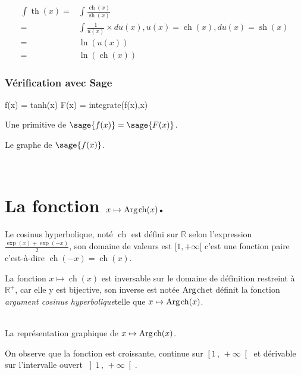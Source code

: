\documentclass[a4paper,12pt]{report}
\def\eclaire{\mathbb}
\def\R{\ensuremath{\eclaire R}}
\renewcommand{\sinh}{\mathop{\mathrm{sh}}}
\renewcommand{\cosh}{\mathop{\mathrm{ch}}}
\renewcommand{\tanh}{\mathop{\mathrm{th}}}
\renewcommand{\arg}{\mathop{\mathrm{Arg}}}
\begin{document}
\begin{align*}
\int \tanh(x) = &\int \frac{\cosh(x)}{\sinh(x)} \\  = & \int \frac{1}{u(x)} \times du(x), u(x) =  \cosh(x), du(x) = \sinh(x) \\ = & \ln(u(x)) \\ = & \ln(\cosh(x))
\end{align*}


\subsubsection{Vérification avec Sage}


\begin{sageblock}
    f(x) = tanh(x)
    F(x) = integrate(f(x),x)
\end{sageblock}

Une primitive de $\sage{f(x)} = \sage{F(x)} $.

Le graphe de $\sage{f(x)} $.


\begin{center}
 \\
\end{center}







\section{La fonction  $x \mapsto \arg\mspace{-1mu}\cosh(x)$.}

Le cosinus hyperbolique, noté $\cosh$ est défini sur $\R$ selon l'expression $\frac{\exp(x)+\exp(-x)}{2}$, son domaine de valeurs est $[1, +\infty [$ 
c'est une fonction paire c'est-à-dire $\cosh(-x)=\cosh(x)$.


La fonction $x \mapsto \cosh(x)$ est inversable sur le domaine de définition restreint à $\R^+$, car elle y est bijective, son inverse est notée \og $ \arg\mspace{-1mu}\cosh $\fg et définit la fonction \og\emph{argument cosinus hyperbolique}\fg telle que $x \mapsto \arg\mspace{-1mu}\cosh(x)$.


\begin{center}
 \\
La représentation graphique de $x \mapsto \arg\mspace{-1mu}\cosh(x)$.
\end{center}
On observe que la fonction est croissante, continue sur $\left[1\,,\,+\infty \right[ $ et dérivable sur l'intervalle ouvert $\left]1\,,\,+\infty \right[ $.
                                                                                               
\end{document}
